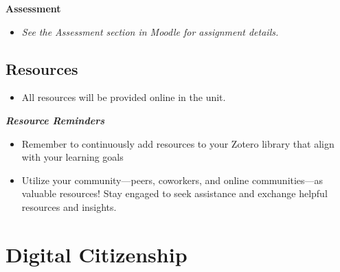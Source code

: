 \documentclass[
  letterpaper,
  DIV=11,
  numbers=noendperiod]{scrreprt}
\providecommand{\tightlist}{%
  \setlength{\itemsep}{0pt}\setlength{\parskip}{0pt}}\usepackage{longtable,booktabs,array}
\begin{document}
\begin{tcolorbox}[enhanced jigsaw, toprule=.15mm, colback=white, colframe=quarto-callout-note-color-frame, arc=.35mm, opacityback=0, breakable, rightrule=.15mm, bottomrule=.15mm, leftrule=.75mm, left=2mm]

\textbf{Assessment}

\begin{itemize}
\tightlist
\item
  \emph{See the Assessment section in Moodle for assignment details.}
\end{itemize}

\end{tcolorbox}

\subsection*{Resources}\label{resources-4}

\begin{itemize}
\tightlist
\item
  All resources will be provided online in the unit.
\end{itemize}

\begin{tcolorbox}[enhanced jigsaw, toprule=.15mm, colback=white, colframe=quarto-callout-note-color-frame, arc=.35mm, opacityback=0, breakable, rightrule=.15mm, bottomrule=.15mm, leftrule=.75mm, left=2mm]
\begin{minipage}[t]{5.5mm}
\textcolor{quarto-callout-note-color}{\faInfo}
\end{minipage}%
\begin{minipage}[t]{\textwidth - 5.5mm}

\textbf{\emph{Resource Reminders}}

\begin{itemize}
\tightlist
\item
  Remember to continuously add resources to your Zotero library that
  align with your learning goals
\item
  Utilize your community---peers, coworkers, and online communities---as
  valuable resources! Stay engaged to seek assistance and exchange
  helpful resources and insights.
\end{itemize}

\end{minipage}%
\end{tcolorbox}

\section{Digital Citizenship}\label{digital-citizenship}
\end{document}
